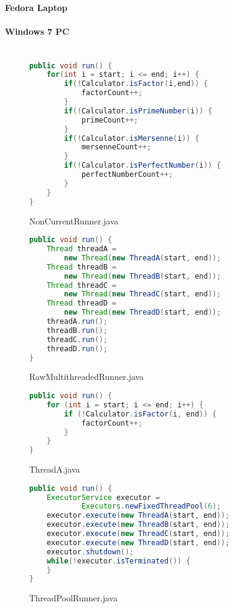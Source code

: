 \documentclass[]{report}
\begin{document}
\subsubsection{Fedora Laptop}
\subsubsection{Windows 7 PC}


\appendix
\chapter{}
\begin{figure}[h!]
	\caption{NonCurrentRunner.java}
	\begin{lstlisting}[language=Java,frame=single]
public void run() {
	for(int i = start; i <= end; i++) {
		if(!Calculator.isFactor(i,end)) {
			factorCount++;
		}
		if(!Calculator.isPrimeNumber(i)) {
			primeCount++;
		}
		if(!Calculator.isMersenne(i)) {
			mersenneCount++;
		}
		if(!Calculator.isPerfectNumber(i)) {
			perfectNumberCount++;
		}
	}
}
	\end{lstlisting}
\end{figure}
\begin{figure}[h!]
	\caption{RawMultithreadedRunner.java}
	\begin{lstlisting}[language=Java,frame=single]
public void run() {
	Thread threadA = 
		new Thread(new ThreadA(start, end));
	Thread threadB = 
		new Thread(new ThreadB(start, end));
	Thread threadC = 
		new Thread(new ThreadC(start, end));
	Thread threadD = 
		new Thread(new ThreadD(start, end));
	threadA.run();
	threadB.run();
	threadC.run();
	threadD.run();
}
	\end{lstlisting}
\end{figure}
\begin{figure}[h!]
	\caption{ThreadA.java}
	\begin{lstlisting}[language=Java,frame=single]
public void run() {
	for (int i = start; i <= end; i++) {
		if (!Calculator.isFactor(i, end)) {
			factorCount++;
		}
	}
}
	\end{lstlisting}
\end{figure}
\begin{figure}[h!]
	\caption{ThreadPoolRunner.java}
	\begin{lstlisting}[language=Java,frame=single]
public void run() {
	ExecutorService executor =
			Executors.newFixedThreadPool(6);
	executor.execute(new ThreadA(start, end));
	executor.execute(new ThreadB(start, end));
	executor.execute(new ThreadC(start, end));
	executor.execute(new ThreadD(start, end));
	executor.shutdown();
	while(!executor.isTerminated()) {
	}
}
	\end{lstlisting}
\end{figure}
\end{document}
